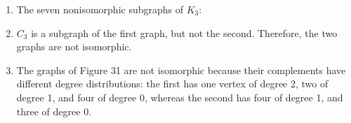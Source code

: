 \documentclass[nobib]{tufte-book}
\begin{document}
\begin{enumerate}
    \item The seven nonisomorphic subgraphs of $K_{3}$:
      \begin{figure}
      \end{figure}

    \item $C_{3}$ is a subgraph of the first graph, but not the
      second. Therefore, the two graphs are not isomorphic.

    \item The graphs of Figure 31 are not isomorphic because their complements
      have different degree distributions: the first has one vertex of degree 2,
      two of degree 1, and four of degree 0, whereas the second has four of
      degree 1, and three of degree 0.
      \begin{marginfigure}[-5em]
      \end{marginfigure}


\end{enumerate}
\end{document}
